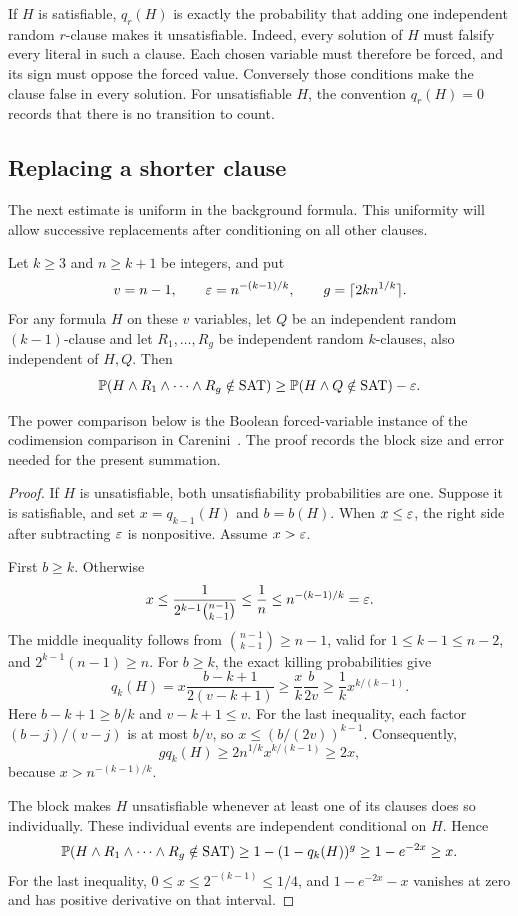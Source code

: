 If \(H\) is satisfiable, \(q_r(H)\) is exactly the probability that
adding one independent random \(r\)-clause makes it unsatisfiable.
Indeed, every solution of \(H\) must falsify every literal in such a
clause. Each chosen variable must therefore be forced, and its sign
must oppose the forced value. Conversely those conditions make the
clause false in every solution. For unsatisfiable \(H\), the convention
\(q_r(H)=0\) records that there is no transition to count.

\subsection{Replacing a shorter clause}

The next estimate is uniform in the background formula. This
uniformity will allow successive replacements after conditioning on all
other clauses.

\begin{samepage}
\begin{lemma}\label{lem:replacement}
Let \(k\ge3\) and \(n\ge k+1\) be integers, and put
\[
 v=n-1,\qquad \varepsilon=n^{-(k-1)/k},\qquad
 g=\lceil2kn^{1/k}\rceil.
\]
For any formula \(H\) on these \(v\) variables, let \(Q\) be an
independent random \((k-1)\)-clause and let \(R_1,\ldots,R_g\) be
independent random \(k\)-clauses, also independent of \(H,Q\). Then
\[
 \mathbb P(H\wedge R_1\wedge\cdots\wedge R_g\notin\mathrm{SAT})
 \ge \mathbb P(H\wedge Q\notin\mathrm{SAT})-\varepsilon.
\]
\end{lemma}
\end{samepage}

The power comparison below is the Boolean forced-variable instance of
the codimension comparison in Carenini~\cite[Lemma~6.1]{Carenini}. The
proof records the block size and error needed for the present summation.

\begin{proof}
If \(H\) is unsatisfiable, both unsatisfiability probabilities are one.
Suppose it is satisfiable, and set \(x=q_{k-1}(H)\) and \(b=b(H)\).
When \(x\le\varepsilon\), the right side after subtracting \(\varepsilon\) is
nonpositive. Assume \(x>\varepsilon\).

First \(b\ge k\). Otherwise
\[
 x\le\frac{1}{2^{k-1}\binom{n-1}{k-1}}
 \le\frac1n\le n^{-(k-1)/k}=\varepsilon.
\]
The middle inequality follows from
\(\binom{n-1}{k-1}\ge n-1\), valid for \(1\le k-1\le n-2\), and
\(2^{k-1}(n-1)\ge n\). For \(b\ge k\), the exact killing probabilities
give
\[
 q_k(H)
 =x\frac{b-k+1}{2(v-k+1)}
 \ge \frac{x}{k}\frac{b}{2v}
 \ge \frac1k x^{k/(k-1)}.
\]
Here \(b-k+1\ge b/k\) and \(v-k+1\le v\). For the last inequality,
each factor \((b-j)/(v-j)\) is at most \(b/v\), so
\(x\le(b/(2v))^{k-1}\). Consequently,
\[
 gq_k(H)\ge2n^{1/k}x^{k/(k-1)}\ge2x,
\]
because \(x>n^{-(k-1)/k}\).

The block makes \(H\) unsatisfiable whenever at least one of its
clauses does so individually. These individual events are independent
conditional on \(H\). Hence
\[
 \mathbb P(H\wedge R_1\wedge\cdots\wedge R_g\notin\mathrm{SAT})
 \ge1-(1-q_k(H))^g
 \ge1-e^{-2x}
 \ge x.
\]
For the last inequality, \(0\le x\le2^{-(k-1)}\le1/4\), and
\(1-e^{-2x}-x\) vanishes at zero and has positive derivative on that
interval.
\end{proof}

